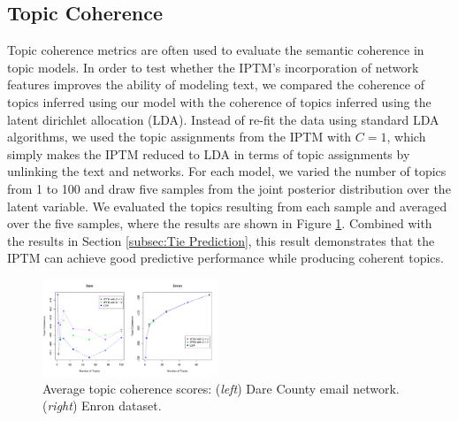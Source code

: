 \documentclass[twoside]{article}
\begin{document}
\subsection{Topic Coherence}\label{subsec:Topic Coherence}
Topic coherence metrics \cite{mimno2011optimizing} are often used to evaluate the semantic coherence in topic models. In order to test whether the IPTM's incorporation of network features improves the ability of modeling text, we compared the coherence of topics inferred using our model with the coherence of topics inferred using the latent dirichlet allocation (LDA). Instead of re-fit the data using standard LDA algorithms, we used the topic assignments from the IPTM with $C=1$, which simply makes the IPTM reduced to LDA in terms of topic assignments by unlinking the text and networks. For each model, we varied the number of topics from 1 to 100 and draw five samples from the joint posterior distribution over the latent variable. We evaluated the topics resulting from each sample and averaged over the five samples, where the results are shown in Figure \ref{fig:topic}. Combined with the results in Section \ref{subsec:Tie Prediction}, this result demonstrates that the IPTM can achieve good predictive performance while producing coherent topics. 
\begin{figure}[h]
	\centering
	\includegraphics[width = 0.47\textwidth]{plots/topic_coherence.pdf}
	\caption{Average topic coherence scores: (\textit{left}) Dare County email network. (\textit{right}) Enron dataset.}
	\label{fig:topic}
	\end{figure}
\end{document}
